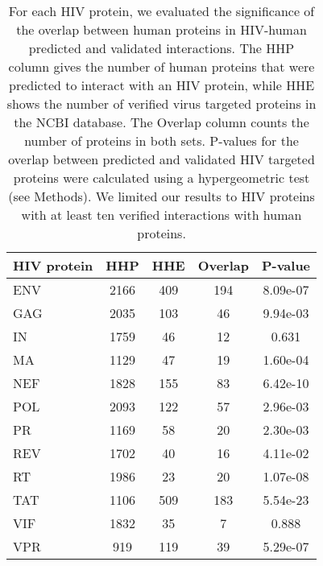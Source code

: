 \begin{table}\footnotesize
\begin{center}
  \begin{tabular}{|l|c|c|c|c|}
  \hline
  HIV protein & HHP & HHE & Overlap & P-value \\
  \hline
ENV&    2166&   409&    194&    8.09e-07\\
GAG&    2035&   103&    46&     9.94e-03\\
IN&     1759&   46&     12&     0.631\\
MA&     1129&   47&     19&     1.60e-04\\
NEF&    1828&   155&    83&     6.42e-10\\
POL&    2093&   122&    57&     2.96e-03\\
PR&     1169&   58&     20&     2.30e-03\\
REV&    1702&   40&     16&     4.11e-02\\
RT&     1986&   23&     20&     1.07e-08\\
TAT&    1106&   509&    183&    5.54e-23\\
VIF&    1832&   35&     7&      0.888\\
VPR&    919&    119&    39&     5.29e-07\\
\hline
  \end{tabular}
\end{center}
\caption[Overlap between predicted and validated HIV-human
  interactions]{\small For each HIV protein, we evaluated the
  significance of the overlap between human proteins in HIV-human
  predicted and validated interactions. The HHP column gives the
  number of human proteins that were predicted to interact with an HIV
  protein, while HHE shows the number of verified virus targeted
  proteins in the NCBI database. The Overlap column counts the number
  of proteins in both sets. P-values for the overlap between predicted
  and validated HIV targeted proteins were calculated using a
  hypergeometric test (see Methods). We limited our results to HIV
  proteins with at least ten verified interactions with human
  proteins. \label{tbl:medGen:eval}}
\end{table}
